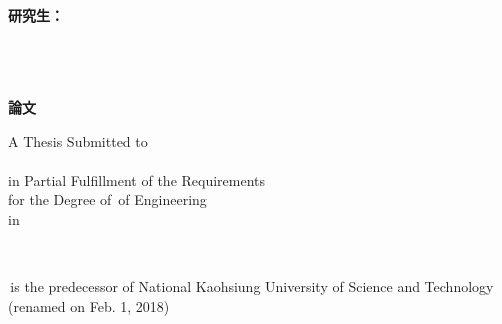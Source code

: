 
\begin{titlepage}
\vspace*{1mm}

\begin{center}

{\LARGE\bfseries  \titletw}\\
\vspace{15mm}
{\LARGE  \titleen}
\vspace{15mm}

{ \large\bfseries {研究生：} \large\authortwname \\
     \large\supervisortwname \\
    \makebox [25mm][l]{ \large\bfseries { }} 
     }

\vspace{7mm}
{\Large\bfseries{\schooltwname}\\
\vspace{4.5mm}
\Large\bfseries{}\\
\vspace{4.5mm}
\Large\bfseries \degreetw 論文}\\
\vspace{10mm}

\vspace{4.5mm}
A Thesis Submitted to \deptenname\\
\schoolenname\\
in Partial Fulfillment of the Requirements\\
for the Degree of \degreeen \,of Engineering\\
in \majortwname

\vspace{15mm}
\dateen\\
\schoolenlocation

\vspace{10mm}
\schoolenoldname \,is the predecessor of
National Kaohsiung University of
Science and Technology (renamed on Feb. 1, 2018)

\vspace{10mm}
\fontsize{14pt}{0pt}{\bfseries{\dateROC }}

\end{center}

\end{titlepage} 